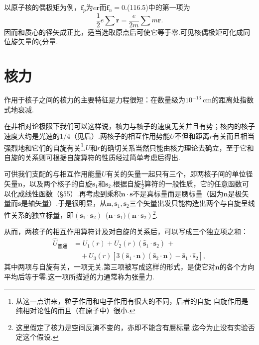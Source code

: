 以原子核的偶极矩为例，$\boldsymbol{f}_p$为$e\boldsymbol{r}$而$\boldsymbol{f}_n=0$.(116.5)中的第一项为
\begin{equation*}
  \frac{1}{2}e\sum\boldsymbol{r}=\frac{e}{2m}\sum m\boldsymbol{r}.
\end{equation*}
因而和质心的径矢成正比，适当选取原点后可使它等于零.可见核偶极矩可化成同位旋矢量的$\zeta$分量.

\section{核力}

作用于核子之间的核力的主要特征是力程很短：在数量级为$10^{-13}\ \mathrm{cm}$的距离处指数式地衰减.

在非相对论极限下我们可以这样说，核力与核子的速度无关并且有势；核内的核子速度大约是光速的1/4（见后）.两核子的相互作用势能$U$不但和距离$r$有关而且相当强烈地和它们的自旋有关\footnote{从这一点讲来，粒子作用和电子作用有很大的不同，后者的自旋-自旋作用是纯相对论性的而且（在原子中）很小.}.$U$和$r$的确切关系当然只能由核力理论去确立，至于它和自旋的关系则可根据自旋算符的性质经过简单考虑后得出.

可供我们支配的与相互作用能量$U$有关的矢量一起只有三个，即两核子间的单位径矢量$\boldsymbol{n}$，以及两个核子的自旋$\boldsymbol{s}_1$和$\boldsymbol{s}_2$.根据自旋$\frac{1}{2}$算符的一般性质，它的任意函数可以化成线性函数（§55）.再考虑到乘积$\boldsymbol{n}\cdot\boldsymbol{s}$不是真标量而是赝标量（因为$\boldsymbol{n}$是极矢量而$\boldsymbol{s}$是轴矢量）.于是很明显，从$\boldsymbol{n},\boldsymbol{s}_1,\boldsymbol{s}_2$三个矢量出发只能构造出两个与自旋呈线性关系的独立标量，即$\left(\boldsymbol{s}_1\cdot\boldsymbol{s}_2\right)$\ ($\boldsymbol{n}\cdot\boldsymbol{s}_1)(\boldsymbol{n}\cdot\boldsymbol{s}_2)$\footnote{这里假定了核力是空间反演不变的，亦即不能含有赝标量.迄今为止没有实验否定这个假设.}.

从而，两核子的相互作用算符计及对自旋的关系后，可以写成三个独立项之和：
\begin{equation}
\begin{aligned}
  \hat{U}_{\text{普通}}&=U_1(r)+U_2(r)\left(\hat{\boldsymbol{s}}_1\cdot\hat{\boldsymbol{s}}_2\right)\,+\\
  &\quad+U_3(r)\left[3(\hat{\boldsymbol{s}}_1\cdot\boldsymbol{n})(\hat{\boldsymbol{s}}_2\cdot\boldsymbol{n})-\hat{\boldsymbol{s}}_1\cdot\hat{\boldsymbol{s}}_2\right],
\end{aligned}
\end{equation}
其中两项与自旋有关，一项无关.第三项被写成这样的形式，是使它对$\boldsymbol{n}$的各个方向平均后等于零.这一项所描述的力通常称为张量力.

